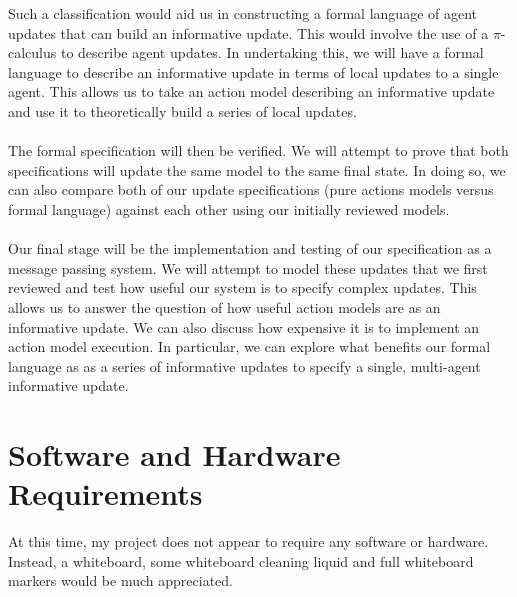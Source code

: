 \documentclass[12pt, a4paper]{article}
\begin{document}
Such a classification would aid us in constructing a formal language of agent updates that can build an informative update.
This would involve the use of a $\pi$-calculus to describe agent updates.
In undertaking this, we will have a formal language to describe an informative update in terms of local updates to a single agent.
This allows us to take an action model describing an informative update and use it to theoretically build a series of local updates.\\
\\
The formal specification will then be verified.
We will attempt to prove that both specifications will update the same model to the same final state.
In doing so, we can also compare both of our update specifications (pure actions models versus formal language) against each other using our initially reviewed models.\\
\\
Our final stage will be the implementation and testing of our specification as a message passing system.
We will attempt to model these updates that we first reviewed and test how useful our system is to specify complex updates.
This allows us to answer the question of how useful action models are as an informative update.
We can also discuss how expensive it is to implement an action model execution.
In particular, we can explore what benefits our formal language as as a series of informative updates to specify a single, multi-agent informative update.

%
\section*{Software and Hardware Requirements}
At this time, my project does not appear to require any software or hardware.
Instead, a whiteboard, some whiteboard cleaning liquid and full whiteboard markers would be much appreciated.
\end{document}
